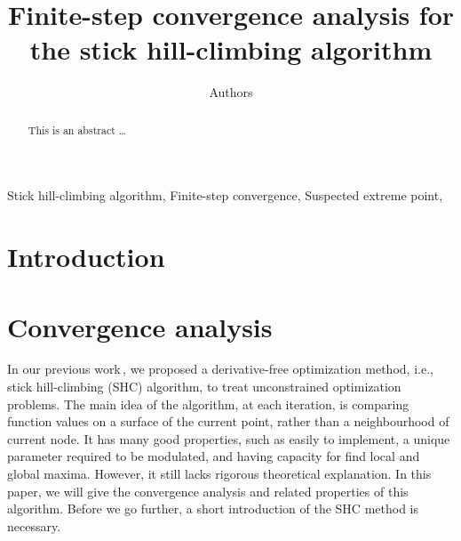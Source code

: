 \documentclass[preprint,12pt]{elsarticle}
\begin{document}
\begin{frontmatter}

\title{Finite-step convergence analysis for the stick hill-climbing algorithm}


\author{Authors }


%

\begin{abstract}
This is an abstract \dots
\end{abstract}

\begin{keyword}
Stick hill-climbing algorithm, Finite-step convergence,
Suspected extreme point,
\end{keyword}

\end{frontmatter}


\section{Introduction}


\section{Convergence analysis}

In our previous work\,\cite{huang2017hill}, we proposed a derivative-free
optimization method, i.e., stick hill-climbing (SHC) algorithm, to
treat unconstrained optimization problems. 
The main idea of the algorithm, at each iteration, is
comparing function values on a surface of the current point,
rather than a neighbourhood of current node. 
It has many good properties, such as easily to implement,
a unique parameter required to be modulated, and having capacity
for find local and global maxima. However, it still lacks rigorous
theoretical explanation. 
In this paper, we will give the convergence analysis and related
properties of this algorithm.
Before we go further, a short introduction of the
SHC method is necessary.
\end{document}
